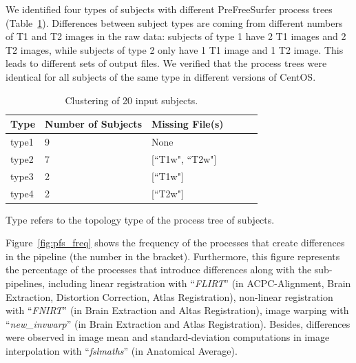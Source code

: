 \documentclass[a4paper,num-refs]{oup-contemporary}
\begin{document}
We identified four types of subjects with different PreFreeSurfer process
trees (Table~\ref{table:data-clusters}). Differences between subject types
are coming from different  numbers of T1 and T2 images in the raw data:
subjects of type 1 have 2 T1 images and 2 T2 images, while subjects of type
2 only have 1 T1 image and 1 T2 image. This leads to
different sets of output files. We verified that the process trees were
identical for all subjects of the same type in different versions of
CentOS.

\begin{table}
\centering
\begin{threeparttable}
\caption{Clustering of 20 input subjects.}
\label{table:data-clusters}

\begin{tabular}{@{}llllll@{}}
\toprule
Type   & Number of Subjects  & Missing File(s)                                    \\ \midrule
type1  & 9                   & None                                               \\
type2  & 7                   & [``T1w", ``T2w"]                                   \\
type3  & 2                   & [``T1w"]                                           \\
type4  & 2                   & [``T2w"]                                           \\ \bottomrule
\end{tabular}
\begin{tablenotes}
     \small
     \item *Type refers to the topology type of the process tree of subjects.
\end{tablenotes}
\end{threeparttable}
\end{table}

Figure~\ref{fig:pfs_freq} shows the frequency of the processes that create differences 
in the pipeline (the number in the bracket).
Furthermore, this figure represents the percentage of the processes that introduce 
differences along with the sub-pipelines, including linear registration 
with “\emph{FLIRT}” (in ACPC-Alignment, Brain Extraction, Distortion Correction, 
Atlas Registration), non-linear registration with “\emph{FNIRT}” (in Brain Extraction 
and Altas Registration), image warping with “\emph{new\_invwarp}” (in Brain Extraction 
and Atlas Registration). 
Besides, differences were observed in image mean and standard-deviation 
computations in image interpolation with “\emph{fslmaths}” (in Anatomical Average). 
\end{document}
